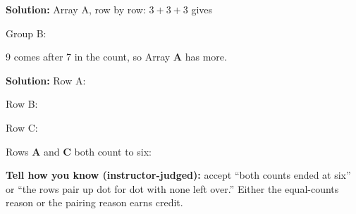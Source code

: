 \documentclass[12pt]{article}
\begin{document}

\textbf{Solution:} Array A, row by row: $3 + 3 + 3$ gives 

Group B: 

9 comes after 7 in the count, so Array \textbf{A} has more. 


\textbf{Solution:} Row A: 

Row B: 

Row C: 

Rows \textbf{A} and \textbf{C} both count to six: 

\textbf{Tell how you know (instructor-judged):} accept ``both counts ended at
six'' or ``the rows pair up dot for dot with none left over.'' Either the
equal-counts reason or the pairing reason earns credit.
\end{document}
